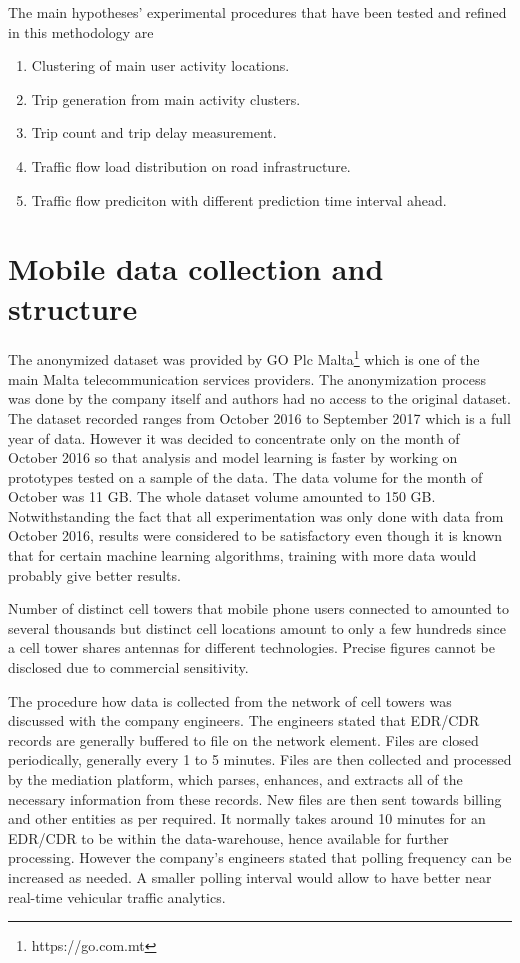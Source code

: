 \documentclass[12pt, a4paper]{report}
\theoremstyle{definition}
\theoremstyle{definition}%
\theoremstyle{definition}%
\theoremstyle{definition}%
\theoremstyle{definition}%
\theoremstyle{definition}%
\begin{document}
The main hypotheses' experimental procedures that have been tested and refined in this methodology are 

\begin{enumerate}
	
	\item Clustering of main user activity locations. 
	\item Trip generation from main activity clusters.
	\item Trip count and trip delay measurement.
	\item Traffic flow load distribution on road infrastructure. 
	\item Traffic flow prediciton with different prediction time interval ahead.
	
\end{enumerate}

\section{Mobile data collection and structure} \label{section:methodology:mobile_data_collection_structure}

The anonymized dataset was provided by GO Plc Malta\footnote{https://go.com.mt} which is one of the main Malta telecommunication services providers. The anonymization process was done by the company itself and authors had no access to the original dataset. The dataset recorded ranges from October 2016 to September 2017 which is a full year of data. However it was decided to concentrate only on the month of October 2016 so that analysis and model learning is faster by working on prototypes tested on a sample of the data. The data volume for the month of October was 11 GB. The whole dataset volume amounted to 150 GB. Notwithstanding the fact that all experimentation was only done with data from October 2016, results were considered to be satisfactory even though it is known that for certain machine learning algorithms, training with more data would probably give better results. 

Number of distinct cell towers that mobile phone users connected to amounted to several thousands but distinct cell locations amount to only a few hundreds since a cell tower shares antennas for different technologies. Precise figures cannot be disclosed due to commercial sensitivity.

The procedure how data is collected from the network of cell towers was discussed with the company engineers. The engineers stated that EDR/CDR records are generally buffered to file on the network element. Files are closed periodically, generally every 1 to 5 minutes. Files are then collected and processed by the mediation platform, which parses, enhances, and extracts all of the necessary information from these records. New files are then sent towards billing and other entities as per required. It normally takes around 10 minutes for an EDR/CDR to be within the data-warehouse, hence available for further processing. However the company's engineers stated that polling frequency can be increased as needed. A smaller polling interval would allow to have better near real-time vehicular traffic analytics.
\end{document}
